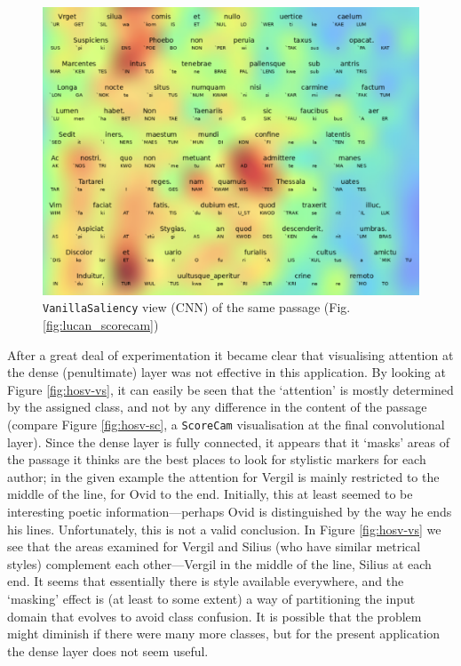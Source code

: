 \documentclass[
    twocolumn,
    hf,
]{ceurart}
\begin{document}
\begin{figure}
    \includegraphics[width=\linewidth]{figures/lucan_vs.png}
    \caption{\texttt{VanillaSaliency} view (CNN) of the same passage
        (Fig. \ref{fig:lucan_scorecam})}
    \label{fig:lucan_vs}
\end{figure}

After a great deal of experimentation it became clear that visualising attention
at the dense (penultimate) layer was not effective in this application. By
looking at Figure \ref{fig:hosv-vs}, it can easily be seen that the
`attention' is mostly determined by the assigned class, and not by any
difference in the content of the passage (compare Figure \ref{fig:hosv-sc}, a
\texttt{ScoreCam} visualisation at the final convolutional layer).
Since the dense layer is fully connected, it appears that it `masks' areas of
the passage it thinks are the best places to look for stylistic markers for each
author; in the given example the attention for Vergil is mainly restricted to
the middle of the line, for Ovid to the end. Initially, this at least seemed to
be interesting poetic information---perhaps Ovid is distinguished by the way he
ends his lines. Unfortunately, this is not a valid conclusion. In Figure
\ref{fig:hosv-vs} we see that the areas examined for Vergil and Silius (who
have similar metrical styles) complement each other---Vergil in the middle of
the line, Silius at each end. It seems that essentially there is style available
everywhere, and the `masking' effect is (at least to some extent) a way of
partitioning the input domain that evolves to avoid class confusion. It is
possible that the problem might diminish if there were many more classes, but
for the present application the dense layer does not seem useful.
\end{document}
